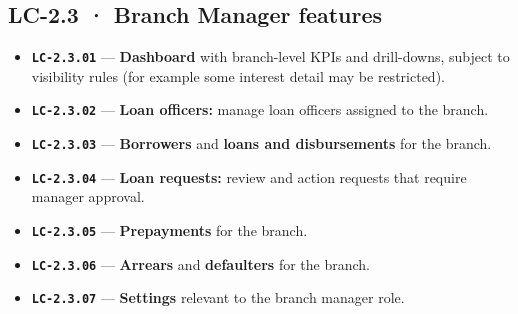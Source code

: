 \documentclass[11pt,a4paper]{article}
\newcommand{\LC}[1]{\textbf{\texttt{#1}}}
\begin{document}
\subsection*{LC-2.3 · Branch Manager features}
\begin{itemize}
  \item \LC{LC-2.3.01} --- \textbf{Dashboard} with branch-level KPIs and drill-downs, subject to visibility rules (for example some interest detail may be restricted).
  \item \LC{LC-2.3.02} --- \textbf{Loan officers:} manage loan officers assigned to the branch.
  \item \LC{LC-2.3.03} --- \textbf{Borrowers} and \textbf{loans and disbursements} for the branch.
  \item \LC{LC-2.3.04} --- \textbf{Loan requests:} review and action requests that require manager approval.
  \item \LC{LC-2.3.05} --- \textbf{Prepayments} for the branch.
  \item \LC{LC-2.3.06} --- \textbf{Arrears} and \textbf{defaulters} for the branch.
  \item \LC{LC-2.3.07} --- \textbf{Settings} relevant to the branch manager role.
\end{itemize}
\end{document}
